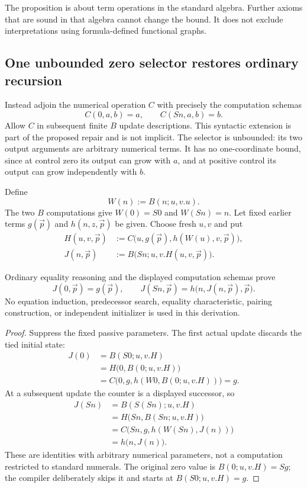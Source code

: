 The proposition is about term operations in the standard algebra. Further
axioms that are sound in that algebra cannot change the bound. It does not
exclude interpretations using formula-defined functional graphs.

\subsection{One unbounded zero selector restores ordinary recursion}

Instead adjoin the numerical operation $C$ with precisely the computation
schemas
\[
                  C(0,a,b)=a,\qquad C(Sn,a,b)=b.
                  \tag{C}
\]
Allow $C$ in subsequent finite $B$ update descriptions. This syntactic
extension is part of the proposed repair and is not implicit. The selector
is unbounded: its two output arguments are arbitrary numerical terms.
It has no one-coordinate bound, since at control zero its output can grow
with $a$, and at positive control its output can grow independently with $b$.

Define
\[
                         W(n):=B(n;u,v.u).
\]
The two $B$ computations give $W(0)=S0$ and $W(Sn)=n$. Let fixed earlier
terms $g(\vec p)$ and $h(n,z,\vec p)$ be given. Choose fresh $u,v$ and put
\[
 \begin{aligned}
 H(u,v,\vec p)&:=C\bigl(u,g(\vec p),h(W(u),v,\vec p)\bigr),\\
 J(n,\vec p)&:=B\bigl(Sn;u,v.H(u,v,\vec p)\bigr).
 \end{aligned}
 \tag{Selector compiler}
\]

\begin{proposition}
Ordinary equality reasoning and the displayed computation schemas prove
\[
 J(0,\vec p)=g(\vec p),\qquad
 J(Sn,\vec p)=h\bigl(n,J(n,\vec p),\vec p\bigr).
\]
No equation induction, predecessor search, equality characteristic,
pairing construction, or independent initializer is used in this derivation.
\end{proposition}
\begin{proof}
Suppress the fixed passive parameters. The first actual update discards
the tied initial state:
\[
 \begin{aligned}
 J(0)
 &=B(S0;u,v.H)\\
 &=H\bigl(0,B(0;u,v.H)\bigr)\\
 &=C\bigl(0,g,h(W0,B(0;u,v.H))\bigr)=g.
 \end{aligned}
\]
At a subsequent update the counter is a displayed successor, so
\[
 \begin{aligned}
 J(Sn)
 &=B(S(Sn);u,v.H)\\
 &=H\bigl(Sn,B(Sn;u,v.H)\bigr)\\
 &=C\bigl(Sn,g,h(W(Sn),J(n))\bigr)\\
 &=h\bigl(n,J(n)\bigr).
 \end{aligned}
\]
These are identities with arbitrary numerical parameters, not a computation
restricted to standard numerals. The original zero value is $B(0;u,v.H)=Sg$;
the compiler deliberately skips it and starts at $B(S0;u,v.H)=g$.
\end{proof}

